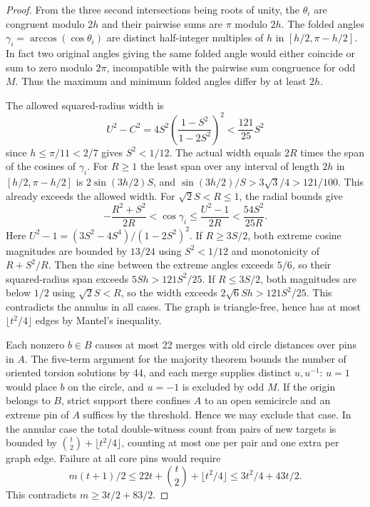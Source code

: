 \begin{proof}
From the three second intersections being roots of unity, the
\(\theta_i\) are congruent modulo \(2h\) and their pairwise sums are
\(\pi\) modulo \(2h\). The folded angles
\(\gamma_i=\arccos(\cos\theta_i)\) are distinct half-integer multiples
of \(h\) in \([h/2,\pi-h/2]\). In fact two original angles giving
the same folded angle would either coincide or sum to zero modulo
\(2\pi\), incompatible with the pairwise sum congruence for odd \(M\).
Thus the maximum and minimum folded angles differ by at least \(2h\).

The allowed squared-radius width is
\[
 U^2-C^2=4S^2\left(\frac{1-S^2}{1-2S^2}\right)^2<\frac{121}{25}S^2
\]
since \(h\le\pi/11<2/7\) gives \(S^2<1/12\). The actual width equals
\(2R\) times the span of the cosines of \(\gamma_i\). For \(R\ge1\)
the least span over any interval of length \(2h\) in
\([h/2,\pi-h/2]\) is \(2\sin(3h/2)S\), and
\(\sin(3h/2)/S>3\sqrt3/4>121/100\). This already exceeds the allowed width.
For \(\sqrt2 S<R\le1\), the radial bounds give
\[
 -\frac{R^2+S^2}{2R}<\cos\gamma_i\le\frac{U^2-1}{2R}<\frac{54S^2}{25R}.
\]
Here \(U^2-1=(3S^2-4S^4)/(1-2S^2)^2\).
If \(R\ge3S/2\), both extreme cosine magnitudes are bounded
by \(13/24\) using \(S^2<1/12\) and monotonicity of \(R+S^2/R\).
Then the sine between the extreme angles exceeds \(5/6\), so their
squared-radius span exceeds \(5Sh>121S^2/25\). If \(R\le3S/2\),
both magnitudes are below \(1/2\) using \(\sqrt2 S<R\), so the width
exceeds \(2\sqrt6 Sh>121S^2/25\). This contradicts the annulus in
all cases. The graph is triangle-free, hence has at most
\(\lfloor t^2/4\rfloor\) edges by Mantel's inequality.

Each nonzero \(b\in B\) causes at most 22 merges with old circle
distances over pins in \(A\). The five-term argument for the majority
theorem bounds the number of oriented torsion solutions by 44, and
each merge supplies distinct \(u,u^{-1}\): \(u=1\) would place \(b\)
on the circle, and \(u=-1\) is excluded by odd \(M\).
If the origin belongs to \(B\), strict support there confines \(A\)
to an open semicircle and an extreme pin of \(A\) suffices by the
threshold. Hence we may exclude that case. In the annular case the
total double-witness count from pairs of new targets is bounded by
\(\binom t2+\lfloor t^2/4\rfloor\), counting at most one per pair and
one extra per graph edge. Failure at all core pins would require
\[
 m(t+1)/2\le22t+\binom t2+\lfloor t^2/4\rfloor
 \le 3t^2/4+43t/2.
\]
This contradicts \(m\ge3t/2+83/2\).


\end{proof}
